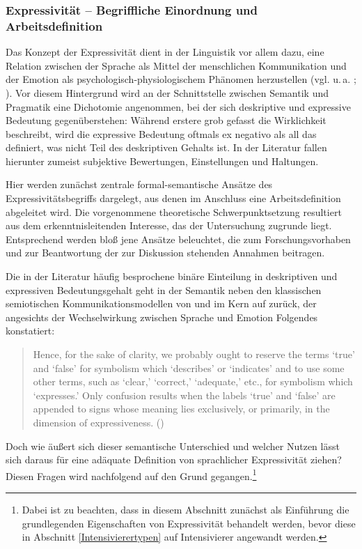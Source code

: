 \subsubsection{Expressivität -- Begriffliche Einordnung und Arbeitsdefinition} \label{Arbeitsdefinition}
Das Konzept der Expressivität dient in der Linguistik vor allem dazu, eine Relation zwischen der Sprache als Mittel der menschlichen Kommunikation und der Emotion als psychologisch-physiologischem Phänomen herzustellen (vgl. u.\,a. \citealt[1]{dAvis.2019b}; \citealt[2]{Scheffler.2023}). Vor diesem Hintergrund wird an der Schnittstelle zwischen Semantik und Pragmatik eine Dichotomie angenommen, bei der sich deskriptive und expressive Bedeutung gegenüberstehen: Während erstere grob gefasst die Wirklichkeit beschreibt, wird die expressive Bedeutung oftmals ex negativo als all das definiert, was nicht Teil des deskriptiven Gehalts ist. In der Literatur fallen hierunter zumeist subjektive Bewertungen, Einstellungen und Haltungen. 

 Hier werden zunächst zentrale formal-semantische Ansätze des Expressivitätsbegriffs dargelegt, aus denen im Anschluss eine Arbeitsdefinition abgeleitet wird. Die vorgenommene theoretische Schwerpunktsetzung resultiert aus dem erkenntnisleitenden Interesse, das der Untersuchung zugrunde liegt. Entsprechend werden bloß jene Ansätze beleuchtet, die zum Forschungsvorhaben und zur Beantwortung der zur Diskussion stehenden Annahmen beitragen.

Die in der Literatur häufig besprochene binäre Einteilung in deskriptiven und expressiven Bedeutungsgehalt geht in der Semantik neben den klassischen semiotischen Kommunikationsmodellen von \citet[]{Buehler.1999} und \citet[]{Jakobson.1960} im Kern auf \citet[]{Hayner.1956} zurück, der angesichts der Wechselwirkung zwischen Sprache und Emotion Folgendes konstatiert:

\begin{quotation} \noindent Hence, for the sake of clarity, we probably ought to reserve the terms `true' and `false' for symbolism which `describes' or `indicates' and to use some other terms, such as `clear,' `correct,' `adequate,' etc., for symbolism which `expresses.' Only confusion results when the labels `true' and `false' are appended to signs whose meaning lies exclusively, or primarily, in the dimension of expressiveness. \hfill (\citealt[155]{Hayner.1956})  \end{quotation}
  

\noindent Doch wie äußert sich dieser semantische Unterschied und welcher Nutzen lässt sich daraus für eine adäquate Definition von sprachlicher Expressivität ziehen? Diesen Fragen wird nachfolgend auf den Grund gegangen.\footnote{Dabei ist zu beachten, dass in diesem Abschnitt zunächst als Einführung die grundlegenden Eigenschaften von Expressivität behandelt werden, bevor diese in Abschnitt \ref{Intensivierertypen} auf Intensivierer angewandt werden.}

